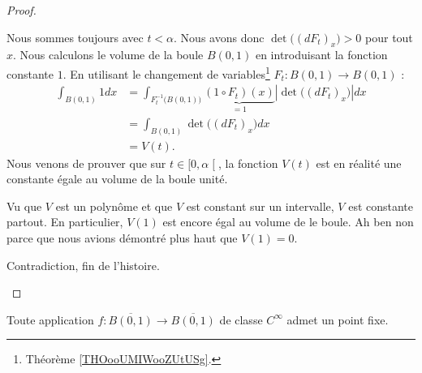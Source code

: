 \begin{proof}
\begin{subproof}

		Nous sommes toujours avec \( t<\alpha\). Nous avons donc \( \det\big( (dF_t)_x \big)>0\) pour tout \( x\). Nous calculons le volume de la boule \( B(0,1)\) en introduisant la fonction constante \( 1\). En utilisant le changement de variables\footnote{Théorème \ref{THOooUMIWooZUtUSg}.} \(F_t \colon B(0,1) \to B(0,1)  \) :
		\begin{subequations}
			\begin{align}
				\int_{B(0,1)}1dx & =\int_{F_t^{-1}\big( B(0,1) \big)}\underbrace{(1\circ F_t)(x)}_{=1}| \det\big( (dF_t)_x \big) |dx \\
				                 & =\int_{B(0,1)}\det\big( (dF_t)_x \big)dx                                                          \\
				                 & =V(t).
			\end{align}
		\end{subequations}
		Nous venons de prouver que sur \( t\in \mathopen[ 0,\alpha\mathclose[\), la fonction \( V(t)\) est en réalité une constante égale au volume de la boule unité.


		Vu que \( V\) est un polynôme et que \( V\) est constant sur un intervalle, \( V\) est constante partout. En particulier, \( V(1)\) est encore égal au volume de le boule. Ah ben non parce que nous avions démontré plus haut que \( V(1)=0\).

		Contradiction, fin de l'histoire.
	\end{subproof}
\end{proof}

\begin{proposition}     \label{PropDRpYwv}
	Toute application  \( f\colon \overline{B(0,1)}\to \overline{B(0,1)}\) de classe \(  C^{\infty}\) admet un point fixe.
\end{proposition}

